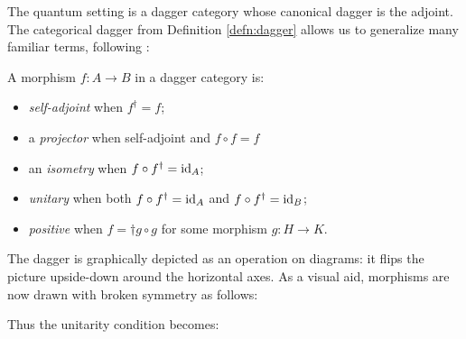 The quantum setting  is a dagger category whose canonical dagger is the adjoint.  The categorical dagger from Definition \ref{defn:dagger} allows us to generalize many familiar terms, following \cite{abramsky2004categorical}:
\begin{defn}
A morphism $f:A\to B$ in a dagger category is:
\begin{itemize}
\item \emph{self-adjoint} when $f^{\dagger} = f$;
\item a \emph{projector} when self-adjoint and $f\circ f = f$
\item an \emph{isometry} when $f \circ f^\dagger = \mbox{id}_{A}$;
\item \emph{unitary} when both $f \circ f^\dagger = \mbox{id}_{A}$ and $f\circ f^\dagger = \mbox{id}_{B}$;
\item \emph{positive} when $f = \dag{g}\circ g$ for some morphism $g:H\to K$.
\end{itemize}
\end{defn}

The dagger is graphically depicted as an operation on diagrams: it flips the picture upside-down around the horizontal axes.  As a visual aid, morphisms are now drawn with broken symmetry as follows:
\begin{equation}
\label{eq:daggerPics}

\end{equation}

Thus the unitarity condition becomes:
\begin{equation}
\label{eq:unitarityPics}

\end{equation}

